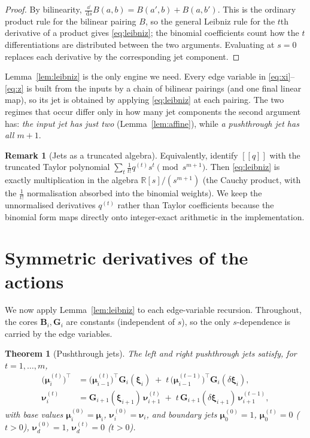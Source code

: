 \documentclass[11pt]{article}
\newcommand{\R}{\mathbb{R}}
\newcommand{\jet}[1]{[\![ #1 ]\!]}   %
\newcommand{\dd}[1]{\,\mathrm{d}#1}
\theoremstyle{definition}
\newtheorem{remark}{Remark}
\theoremstyle{plain}
\newtheorem{theorem}{Theorem}
\begin{document}
\begin{proof}
By bilinearity, $\tfrac{\dd}{\dd s} B(a,b) = B(a',b) + B(a,b')$. This is the ordinary product rule
for the bilinear pairing $B$, so the general Leibniz rule for the $t$th derivative of a product gives
\eqref{eq:leibniz}; the binomial coefficients count how the $t$ differentiations are distributed
between the two arguments. Evaluating at $s=0$ replaces each derivative by the corresponding jet
component.
\end{proof}

Lemma~\ref{lem:leibniz} is the only engine we need. Every edge variable in
\eqref{eq:xi}--\eqref{eq:z} is built from the inputs by a chain of bilinear pairings (and one final
linear map), so its jet is obtained by applying \eqref{eq:leibniz} at each pairing. The two regimes
that occur differ only in how many jet components the second argument has: \emph{the input jet has
just two} (Lemma~\ref{lem:affine}), while \emph{a pushthrough jet has all $m{+}1$}.

\begin{remark}[Jets as a truncated algebra]
\label{rem:algebra}
Equivalently, identify $\jet{q}$ with the truncated Taylor polynomial $\sum_{t} \tfrac{1}{t!}
q^{(t)} s^{t} \pmod{s^{m+1}}$. Then \eqref{eq:leibniz} is exactly multiplication in the algebra
$\R[s]/(s^{m+1})$ (the Cauchy product, with the $\tfrac1{t!}$ normalisation absorbed into the
binomial weights). We keep the unnormalised derivatives $q^{(t)}$ rather than Taylor coefficients
because the binomial form maps directly onto integer-exact arithmetic in the implementation.
\end{remark}

\section{Symmetric derivatives of the actions}
\label{sec:derivs}

We now apply Lemma~\ref{lem:leibniz} to each edge-variable recursion. Throughout, the cores $\mathbf
B_i, \mathbf G_i$ are constants (independent of $s$), so the only $s$-dependence is carried by the
edge variables.

\begin{theorem}[Pushthrough jets]
\label{thm:push}
The left and right pushthrough jets satisfy, for $t = 1, \dots, m$,
\begin{align}
  \big(\boldsymbol\mu_i^{(t)}\big)^\top
    &= \big(\boldsymbol\mu_{i-1}^{(t)}\big)^\top \mathbf G_i(\boldsymbol\xi_i)
     \;+\; t\,\big(\boldsymbol\mu_{i-1}^{(t-1)}\big)^\top \mathbf G_i(\delta\boldsymbol\xi_i),
    \label{eq:dmu}\\[2pt]
  \boldsymbol\nu_i^{(t)}
    &= \mathbf G_{i+1}(\boldsymbol\xi_{i+1})\, \boldsymbol\nu_{i+1}^{(t)}
     \;+\; t\,\mathbf G_{i+1}(\delta\boldsymbol\xi_{i+1})\, \boldsymbol\nu_{i+1}^{(t-1)},
    \label{eq:dnu}
\end{align}
with base values $\boldsymbol\mu_i^{(0)} = \boldsymbol\mu_i$, $\boldsymbol\nu_i^{(0)} =
\boldsymbol\nu_i$, and boundary jets $\boldsymbol\mu_0^{(0)} = 1$, $\boldsymbol\mu_0^{(t)} = 0$
($t>0$), $\boldsymbol\nu_d^{(0)} = 1$, $\boldsymbol\nu_d^{(t)} = 0$ ($t>0$).
\end{theorem}
\end{document}
